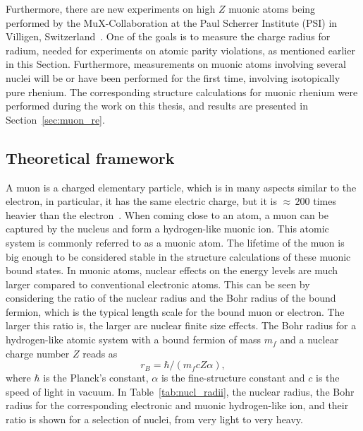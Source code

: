 Furthermore, there are new experiments on high $Z$ muonic atoms being performed by the MuX-Collaboration at the Paul Scherrer Institute (PSI) in Villigen, Switzerland~\cite{kirch2016}. One of the goals is to measure the charge radius for radium, needed for experiments on atomic parity violations, as mentioned earlier in this Section. Furthermore, measurements on muonic atoms involving several nuclei will be or have been performed for the first time, involving isotopically pure rhenium. The corresponding structure calculations for muonic rhenium were performed during the work on this thesis, and results are presented in Section~\ref{sec:muon_re}.

\subsection{Theoretical framework}
\label{sec:muon_framework}
A muon is a charged elementary particle, which is in many aspects similar to the electron, in particular, it has the same electric charge, but it is ${\approx}\,{200}$ times heavier than the electron~\cite{codata}. When coming close to an atom, a muon can be captured by the nucleus and form a hydrogen-like muonic ion. This atomic system is commonly referred to as a muonic atom. The lifetime of the muon is big enough to be considered stable in the structure calculations of these muonic bound states.
In muonic atoms, nuclear effects on the energy levels are much larger compared to conventional electronic atoms. This can be seen by considering the ratio of the nuclear radius and the Bohr radius of the bound fermion, which is the typical length scale for the bound muon or electron. The larger this ratio is, the larger are nuclear finite size effects. The Bohr radius for a hydrogen-like atomic system with a bound fermion of mass $m_f$ and a nuclear charge number $Z$ reads as
\begin{equation}
r_B = \hbar / (m_f c Z \alpha),
\end{equation}
where $\hbar$ is the Planck's constant, $\alpha$ is the fine-structure constant and $c$ is the speed of light in vacuum. In Table~\ref{tab:nucl_radii}, the nuclear radius, the Bohr radius for the corresponding electronic and muonic hydrogen-like ion, and their ratio is shown for a selection of nuclei, from very light to very heavy.
%
%
